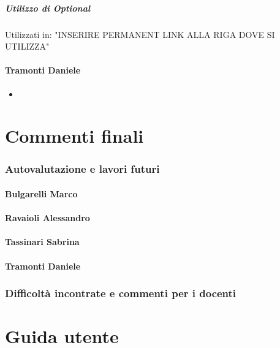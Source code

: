 \documentclass{report}
\begin{document}
\paragraph{Utilizzo di Optional}
Utilizzati in: "INSERIRE PERMANENT LINK ALLA RIGA DOVE SI UTILIZZA"

\subsubsection{Tramonti Daniele}
\begin{itemize}
    \item 
\end{itemize}

\chapter{Commenti finali}

\subsection{Autovalutazione e lavori futuri}

\subsubsection{Bulgarelli Marco}

\subsubsection{Ravaioli Alessandro}

\subsubsection{Tassinari Sabrina}

\subsubsection{Tramonti Daniele}

\subsection{Difficoltà incontrate e commenti per i docenti}

\appendix
\chapter{Guida utente}
\end{document}

